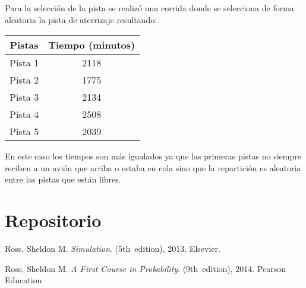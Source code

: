 \documentclass[a4paper,10pt,twocolumn]{article}
\begin{document}
	Para la selecci\'on de la pista se realiz\'o una corrida donde se selecciona de forma
	aleatoria la pista de aterrizaje resultando:
	\begin{center}
		\begin{tabular}[t]{|c|c|}
			\hline
			Pistas & Tiempo (minutos) \\ \hline
			Pista 1 & 2118 \\ \hline
			Pista 2 & 1775 \\ \hline
			Pista 3 & 2134 \\ \hline
			Pista 4 & 2508 \\ \hline
			Pista 5 & 2039 \\ \hline
		\end{tabular}
	\end{center}

	En este caso los tiempos son m\'as igualados ya que las primeras pistas no siempre
	reciben a un avi\'on que arriba o estaba en cola sino que la repartici\'on es aleatoria
	entre las pistas que est\'an libres.

\section{Repositorio}\label{sec:conc}


\begin{thebibliography}{99}
	 Ross, Sheldon M. \emph{Simulation}.
		(5th~edition), 2013.
		Elsevier.
		
	 Ross, Sheldon M. \emph{A First Course in Probability}.
		(9th~edition), 2014.
		Pearson Education

\end{thebibliography}


\label{end}
\end{document}
